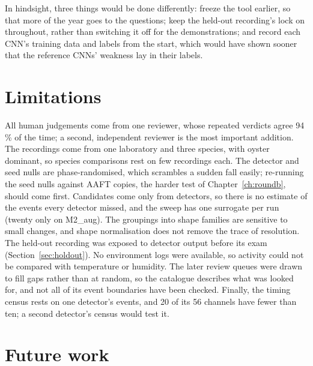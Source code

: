 In hindsight, three things would be done differently: freeze the tool earlier, so that more of the year goes to the questions; keep the held-out recording's lock on throughout, rather than switching it off for the demonstrations; and record each CNN's training data and labels from the start, which would have shown sooner that the reference CNNs' weakness lay in their labels.

\section{Limitations}

All human judgements come from one reviewer, whose repeated verdicts agree 94\,\% of the time; a second, independent reviewer is the most important addition. The recordings come from one laboratory and three species, with oyster dominant, so species comparisons rest on few recordings each. The detector and seed nulls are phase-randomised, which scrambles a sudden fall easily; re-running the seed nulls against AAFT copies, the harder test of Chapter~\ref{ch:roundb}, should come first. Candidates come only from detectors, so there is no estimate of the events every detector missed, and the sweep has one surrogate per run (twenty only on M2\_aug). The groupings into shape families are sensitive to small changes, and shape normalisation does not remove the trace of resolution. The held-out recording was exposed to detector output before its exam (Section~\ref{sec:holdout}). No environment logs were available, so activity could not be compared with temperature or humidity. The later review queues were drawn to fill gaps rather than at random, so the catalogue describes what was looked for, and not all of its event boundaries have been checked. Finally, the timing census rests on one detector's events, and 20 of its 56 channels have fewer than ten; a second detector's census would test it.

\section{Future work}
\label{sec:futurework}

